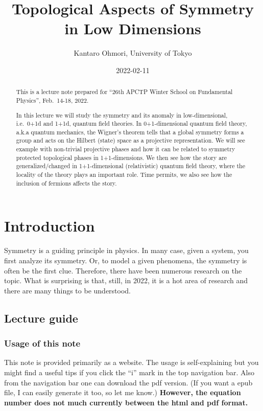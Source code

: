 \documentclass[
]{scrartcl}
\title{Topological Aspects of Symmetry in Low Dimensions}
\author{Kantaro Ohmori, University of Tokyo}
\date{2022-02-11}
\numberwithin{equation}{section}
\theoremstyle{definition}
\theoremstyle{definition}
\theoremstyle{definition}
\theoremstyle{definition}
\theoremstyle{remark}
\begin{document}
\maketitle
\begin{abstract}
This is a lecture note prepared for ``26th APCTP Winter School on Fundamental Physics'', Feb.~14-18, 2022.

In this lecture we will study the symmetry and its anomaly in low-dimensional, i.e.~0+1d and 1+1d, quantum field theories.
In 0+1-dimensional quantum field theory, a.k.a quantum mechanics, the Wigner's theorem tells that a global symmetry forms a group and acts on the Hilbert (state) space as a projective representation. We will see example with non-trivial projective phases and how it can be related to symmetry protected topological phases in 1+1-dimensions. We then see how the story are generalized/changed in 1+1-dimensional (relativistic) quantum field theory, where the locality of the theory plays an important role.
Time permits, we also see how the inclusion of fermions affects the story.
\end{abstract}

{
\setcounter{tocdepth}{2}
\tableofcontents
}
\hypertarget{introduction}{%
\section{Introduction}\label{introduction}}

Symmetry is a guiding principle in physics. In many case, given a system, you first analyze its symmetry. Or, to model a given phenomena, the symmetry is often be the first clue.
Therefore, there have been numerous research on the topic. What is surprising is that, still, in 2022, it is a hot area of research and there are many things to be understood.

\hypertarget{lecture-guide}{%
\subsection{Lecture guide}\label{lecture-guide}}

\hypertarget{usage-of-this-note}{%
\subsubsection{Usage of this note}\label{usage-of-this-note}}

This note is provided primarily as a website.
The usage is self-explaining but you might find a useful tips if you click the ``i'' mark in the top navigation bar. Also from the navigation bar one can download the pdf version. (If you want a epub file, I can easily generate it too, so let me know.) \textbf{However, the equation number does not much currently between the html and pdf format.}
\end{document}
